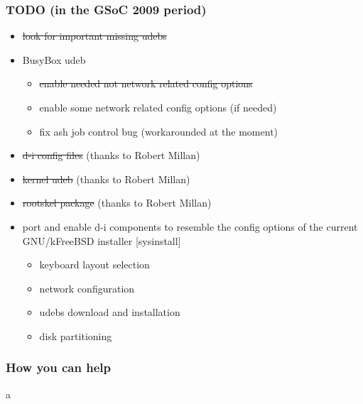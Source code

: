 \documentclass{beamer}
\begin{document}
\begin{frame}
  \frametitle{TODO (in the GSoC 2009 period)}

  \begin{itemize}
  \item
    \st{look for important missing udebs}
  \item
    BusyBox udeb
    \begin{itemize}
    \item
      \st{enable needed not network related config options}
    \item
      enable some network related config options (if needed)
    \item
      fix ash job control bug (workarounded at the moment)
    \end{itemize}
  \item
    \st{d-i config files} (thanks to Robert Millan)
  \item
    \st{kernel udeb} (thanks to Robert Millan)
  \item
    \st{rootskel package} (thanks to Robert Millan)
  \item
    port and enable d-i components to resemble the config options of the current GNU/kFreeBSD installer [sysinstall]
    \begin{itemize}
    \item
      keyboard layout selection
    \item
      network configuration
    \item
      udebs download and installation
    \item
      disk partitioning
    \end{itemize}
  \end{itemize}

\end{frame}

\begin{frame}
  \frametitle{How you can help}

  a

\end{frame}
\end{document}
